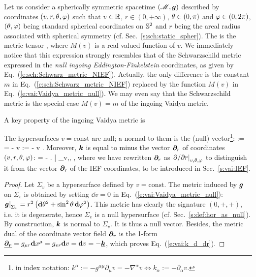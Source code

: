 Let us consider a spherically symmetric spacetime $(\mathscr{M},\bm{g})$ described by
coordinates $(v,r,\theta,\varphi)$ such that $v\in \mathbb{R}$, $r\in(0, +\infty)$,
$\theta\in(0,\pi)$ and $\varphi\in(0,2\pi)$, $(\theta,\varphi)$ being standard
spherical coordinates on $\mathbb{S}^2$ and $r$ being the areal radius associated
with spherical symmetry (cf. Sec.~\ref{s:sch:static_spher}).
The 
is the metric tensor
\be \label{e:vai:Vaidya_metric_null}
     ,
\ee
where $M(v)$ is a real-valued function of $v$.
We immediately notice that this expression strongly resembles that
of the Schwarzschild metric expressed in the
\emph{null ingoing Eddington-Finkelstein}
coordinates, as given by Eq.~(\ref{e:sch:Schwarz_metric_NIEF}). Actually, the
only difference is the constant $m$ in Eq.~(\ref{e:sch:Schwarz_metric_NIEF})
replaced by the function $M(v)$ in Eq.~(\ref{e:vai:Vaidya_metric_null}).
We may even say that the Schwarzschild metric is the special case $M(v) = m$ of
the ingoing Vaidya metric.

A key property of the ingoing Vaidya metric is
\begin{greybox}
The hypersurfaces $v = \mathrm{const}$ are null; a normal to them is the (null)
vector\footnote{in index notation: $k^\alpha := - g^{\alpha\mu} \partial_\mu v = - \nabla^\alpha v \iff
k_\alpha := - \partial_\alpha v $.}:
\be \label{e:vai:def_k}
     := -  = - \vw{\nabla} v \quad\iff\quad
     := - \dd v .
\ee
Moreover, $\bm{k}$ is equal to minus the vector $\bm{\partial}_r$ of coordinates
$(v,r,\theta,\varphi)$:
\be \label{e:vai:k_d_dr}
     = - \left.  \right| _{v,\th,\ph} ,
\ee
where we have rewritten $\bm{\partial}_r$ as $\left. {\partial }/{\partial r} \right| _{v,\theta,\varphi}$
to distinguish it from the vector $\bm{\partial}_r$ of the IEF coordinates, to be
introduced in Sec.~\ref{s:vai:IEF}.
\end{greybox}
\begin{proof}
Let $\Sigma_v$ be a hypersurface defined by $v = \mathrm{const}$.
The metric induced by $\bm{g}$ on $\Sigma_v$
is obtained by setting $\dd v = 0$ in Eq.~(\ref{e:vai:Vaidya_metric_null}):
$\left.\bm{g}\right| _{\Sigma_v} = r^2 \left( \mathbf{d}\theta^2 + \sin^2\theta\, \mathbf{d}\varphi^2 \right)$.
This metric has clearly the signature $(0, +, +)$, i.e. it is degenerate, hence
$\Sigma_v$ is a null hypersurface (cf. Sec.~\ref{s:def:hor_as_null}).
By construction, $\bm{k}$ is normal to $\Sigma_v$. It is thus a null vector.
Besides, the metric dual of
the coordinate vector field $\bm{\partial}_r$ is the 1-form
$\underline{\bm{\bm{\partial}_r}} = g_{\mu r}\mathbf{d} x^\mu = g_{vr} \mathbf{d} v = \mathbf{d} v = - \underline{\bm{k}}$,
which proves Eq.~(\ref{e:vai:k_d_dr}).
\end{proof}

